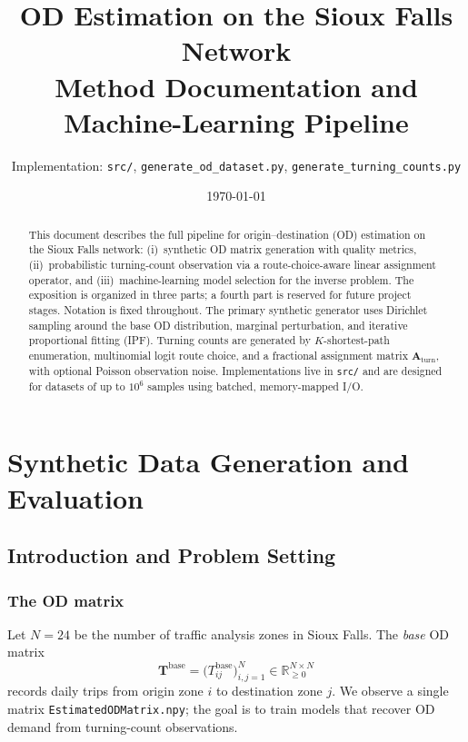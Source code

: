 \documentclass[11pt,a4paper]{report}
\title{OD Estimation on the Sioux Falls Network\\[0.4em]
\large Method Documentation and Machine-Learning Pipeline}
\author{Implementation: \texttt{src/}, \texttt{generate\_od\_dataset.py}, \texttt{generate\_turning\_counts.py}}
\date{\today}
\newcommand{\Tbase}{\mathbf{T}^{\mathrm{base}}}
\newcommand{\Aturn}{\mathbf{A}_{\mathrm{turn}}}
\begin{document}
\maketitle

\begin{abstract}
This document describes the full pipeline for origin--destination (OD) estimation on the Sioux Falls network: (i)~synthetic OD matrix generation with quality metrics, (ii)~probabilistic turning-count observation via a route-choice-aware linear assignment operator, and (iii)~machine-learning model selection for the inverse problem. The exposition is organized in three parts; a fourth part is reserved for future project stages. Notation is fixed throughout. The primary synthetic generator uses Dirichlet sampling around the base OD distribution, marginal perturbation, and iterative proportional fitting (IPF). Turning counts are generated by $K$-shortest-path enumeration, multinomial logit route choice, and a fractional assignment matrix $\Aturn$, with optional Poisson observation noise. Implementations live in \texttt{src/} and are designed for datasets of up to $10^6$ samples using batched, memory-mapped I/O.
\end{abstract}

\tableofcontents
\newpage

\part{Synthetic Data Generation and Evaluation}
\label{part:synthetic}

\chapter{Introduction and Problem Setting}
\label{ch:intro}

\section{The OD matrix}

Let $N=24$ be the number of traffic analysis zones in Sioux Falls. The \emph{base} OD matrix
\begin{equation}
    \Tbase = \bigl(T^{\mathrm{base}}_{ij}\bigr)_{i,j=1}^{N} \in \mathbb{R}_{\ge 0}^{N \times N}
\end{equation}
records daily trips from origin zone $i$ to destination zone $j$. We observe a single matrix \texttt{EstimatedODMatrix.npy}; the goal is to train models that recover OD demand from turning-count observations.
\end{document}
